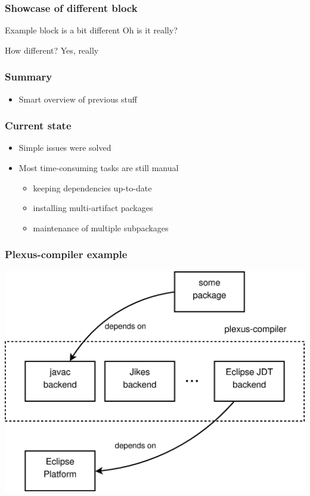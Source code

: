 \documentclass[pdftex,unicode,xcolor=table]{beamer}
\begin{document}
\begin{frame}
  \frametitle{Showcase of different block}
  \begin{exampleblock}{Example block is a bit different}
    Oh is it really?
  \end{exampleblock}

  \begin{block}{How different?}
    Yes, really
  \end{block}
\end{frame}


\begin{frame}
  \frametitle{Summary}
  \begin{itemize}
    \item Smart overview of previous stuff
  \end{itemize}
\end{frame}




\begin{frame}
  \frametitle{Current state}
  \begin{itemize}
    \item Simple issues were solved
    \item Most time-consuming tasks are still manual
    \begin{itemize}
      \item keeping dependencies up-to-date
      \item installing multi-artifact packages
      \item maintenance of multiple subpackages
    \end{itemize}
  \end{itemize}
\end{frame}


\begin{frame}[fragile]
  \frametitle{Plexus-compiler example}
  \begin{center}
    \includegraphics[scale=0.3]{plexus-compiler.eps}
  \end{center}
\end{frame}
\end{document}
